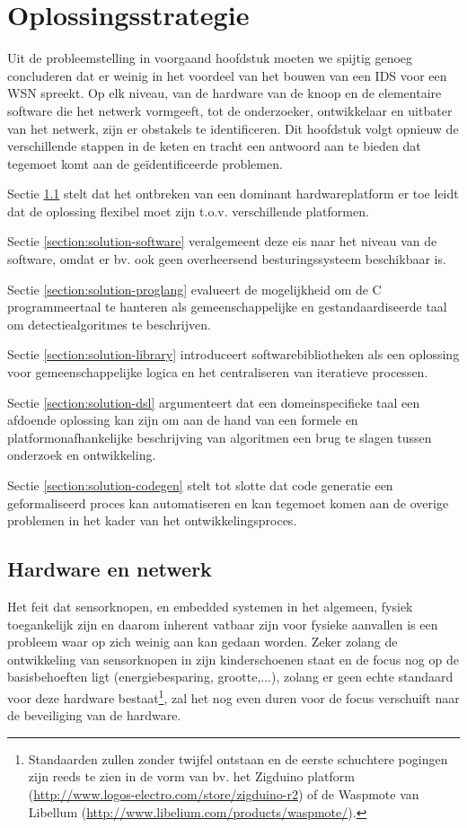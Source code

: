 
\chapter{Oplossingsstrategie}
\label{chapter:oplossingsstrategie}

Uit de probleemstelling in voorgaand hoofdstuk moeten we spijtig genoeg
concluderen dat er weinig in het voordeel van het bouwen van een IDS voor een
WSN spreekt. Op elk niveau, van de hardware van de knoop en de elementaire
software die het netwerk vormgeeft, tot de onderzoeker, ontwikkelaar en
uitbater van het netwerk, zijn er obstakels te identificeren. Dit hoofdstuk
volgt opnieuw de verschillende stappen in de keten en tracht een antwoord aan
te bieden dat tegemoet komt aan de ge\"identificeerde problemen.

Sectie \ref{section:solution-node-wsn} stelt dat het ontbreken van een dominant
hardwareplatform er toe leidt dat de oplossing flexibel moet zijn t.o.v.
verschillende platformen.

Sectie \ref{section:solution-software} veralgemeent deze eis naar het niveau
van de software, omdat er bv. ook geen overheersend besturingssysteem
beschikbaar is.

Sectie \ref{section:solution-proglang} evalueert de mogelijkheid om de C
programmeertaal te hanteren als gemeenschappelijke en gestandaardiseerde taal
om detectiealgoritmes te beschrijven.

Sectie \ref{section:solution-library} introduceert softwarebibliotheken als een
oplossing voor gemeenschappelijke logica en het centraliseren van iteratieve
processen.

Sectie \ref{section:solution-dsl} argumenteert dat een domeinspecifieke taal
een afdoende oplossing kan zijn om aan de hand van een formele en
platformonafhankelijke beschrijving van algoritmen een brug te slagen tussen
onderzoek en ontwikkeling.

Sectie \ref{section:solution-codegen} stelt tot slotte dat code generatie een
geformaliseerd proces kan automatiseren en kan tegemoet komen aan de overige
problemen in het kader van het ontwikkelingsproces.

\section{Hardware en netwerk}
\label{section:solution-node-wsn}

Het feit dat sensorknopen, en embedded systemen in het algemeen, fysiek
toegankelijk zijn en daarom inherent vatbaar zijn voor fysieke aanvallen is een
probleem waar op zich weinig aan kan gedaan worden. Zeker zolang de
ontwikkeling van sensorknopen in zijn kinderschoenen staat en de focus nog op
de basisbehoeften ligt (energiebesparing, grootte,...), zolang er geen echte
standaard voor deze hardware bestaat\footnote{Standaarden zullen zonder twijfel
ontstaan en de eerste schuchtere pogingen zijn reeds te zien in de vorm van bv.
het Zigduino platform (\url{http://www.logos-electro.com/store/zigduino-r2}) of
de Waspmote van Libellum (\url{http://www.libelium.com/products/waspmote/}).},
zal het nog even duren voor de focus verschuift naar de beveiliging van de
hardware.

